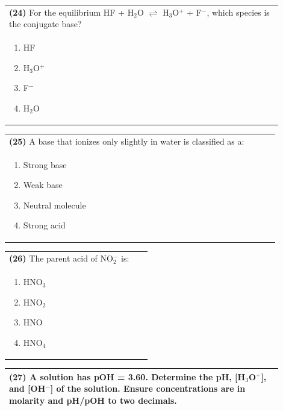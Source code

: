 \documentclass{article}
\begin{document}
\noindent\begin{tabular}{|p{0.9\linewidth}|}
\hline
\textbf{(24)} For the equilibrium HF + H$_2$O $\rightleftharpoons$ H$_3$O$^+$ + F$^-$, which species is the conjugate base? \\[0.2cm]
\begin{minipage}{0.85\linewidth}
\begin{enumerate}[label=\alph*.]
\item HF \item H$_3$O$^+$ \item F$^-$ \item H$_2$O
\end{enumerate}
\end{minipage}\\[0.2cm]
\hline
\end{tabular}
\newpage

\noindent\begin{tabular}{|p{0.9\linewidth}|}
\hline
\textbf{(25)} A base that ionizes only slightly in water is classified as a: \\[0.2cm]
\begin{minipage}{0.85\linewidth}
\begin{enumerate}[label=\alph*.]
\item Strong base \item Weak base \item Neutral molecule \item Strong acid
\end{enumerate}
\end{minipage}\\[0.2cm]
\hline
\end{tabular}

\noindent\begin{tabular}{|p{0.9\linewidth}|}
\hline
\textbf{(26)} The parent acid of NO$_2^-$ is: \\[0.2cm]
\begin{minipage}{0.85\linewidth}
\begin{enumerate}[label=\alph*.]
\item HNO$_3$ \item HNO$_2$ \item HNO \item HNO$_4$
\end{enumerate}
\end{minipage}\\[0.2cm]
\hline
\end{tabular}

\noindent\begin{tabular}{|p{0.9\linewidth}|}
\hline
\textbf{(27)} A solution has pOH = 3.60. Determine the pH, [H$_3$O$^+$], and [OH$^-$] of the solution.  Ensure concentrations are in molarity and pH/pOH to two decimals. \\[4cm]
\hline
\end{tabular}
\end{document}
